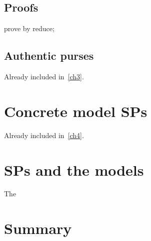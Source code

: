 \subsection*{Proofs}

\begin{LDCheck}\begin{zproof}
   prove by reduce;
\end{zproof}\end{LDCheck}

\subsection{Authentic purses}

Already included in~\ref{ch3}.

\section{Concrete model SPs}

Already included in~\ref{ch4}.

\section{SPs and the models}

The

%
%
%
%

%
%
%

\newpage
\section{Summary}\label{apch2.summary}

\ldefsummary %
\lthmsummary %
\lthmaddeddefsummary %
\lthmaddedthmsummary %
\lzevessummary %

